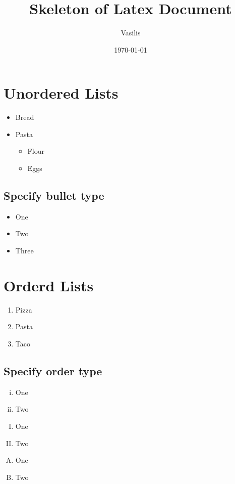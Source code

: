 \documentclass{article}
\title{Skeleton of Latex Document}
\author{Vasilis}
\date{\today}
\begin{document}
\maketitle

\section{Unordered Lists}

\begin{itemize}
	\item Bread
	\item Pasta
	\begin{itemize}
		\item Flour
		\item Eggs
	\end{itemize}
\end{itemize}

\subsection{Specify bullet type}
\begin{itemize}
	\item[-] One
	\item Two
	\item Three
\end{itemize}

\section{Orderd Lists}

\begin{enumerate}
	\item Pizza
	\item Pasta
	\item Taco
\end{enumerate}

\subsection{Specify order type}

\begin{enumerate}[i)]
	\item One
	\item Two
\end{enumerate}

\begin{enumerate}[I.]
	\item One
	\item Two
\end{enumerate}

\begin{enumerate}[A.]
\item One
\item Two
\end{enumerate}
\end{document}
